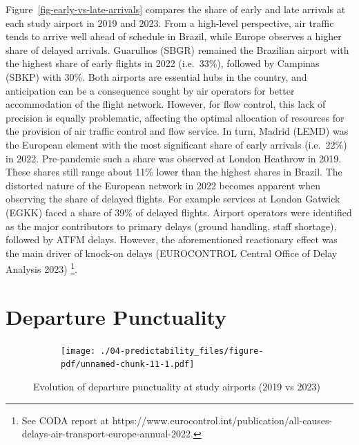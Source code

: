 \documentclass[
  a4paper,
  DIV=11,
  numbers=noendperiod]{scrreport}
\begin{document}
Figure~\ref{fig-early-vs-late-arrivals} compares the share of early and
late arrivals at each study airport in 2019 and 2023. From a high-level
perspective, air traffic tends to arrive well ahead of schedule in
Brazil, while Europe observes a higher share of delayed arrivals.
Guarulhos (SBGR) remained the Brazilian airport with the highest share
of early flights in 2022 (i.e.~33\%), followed by Campinas (SBKP) with
30\%. Both airports are essential hubs in the country, and anticipation
can be a consequence sought by air operators for better accommodation of
the flight network. However, for flow control, this lack of precision is
equally problematic, affecting the optimal allocation of resources for
the provision of air traffic control and flow service. In turn, Madrid
(LEMD) was the European element with the most significant share of early
arrivals (i.e.~22\%) in 2022. Pre-pandemic such a share was observed at
London Heathrow in 2019. These shares still range about 11\% lower than
the highest shares in Brazil. The distorted nature of the European
network in 2022 becomes apparent when observing the share of delayed
flights. For example services at London Gatwick (EGKK) faced a share of
39\% of delayed flights. Airport operators were identified as the major
contributors to primary delays (ground handling, staff shortage),
followed by ATFM delays. However, the aforementioned reactionary effect
was the main driver of knock-on delays (EUROCONTROL Central Office of
Delay Analysis 2023) \footnote{See CODA report at
  https://www.eurocontrol.int/publication/all-causes-delays-air-transport-europe-annual-2022.}.

\hypertarget{departure-punctuality}{%
\section{Departure Punctuality}\label{departure-punctuality}}

\begin{figure}

\begin{minipage}[t]{\linewidth}

{\centering 

\begin{figure}[H]

{\centering \texttt{[image: ./04-predictability\_files/figure-pdf/unnamed-chunk-11-1.pdf]}

}

\end{figure}

}

\end{minipage}%

\caption{\label{fig-departure-punc}Evolution of departure punctuality at
study airports (2019 vs 2023)}

\end{figure}
\end{document}
